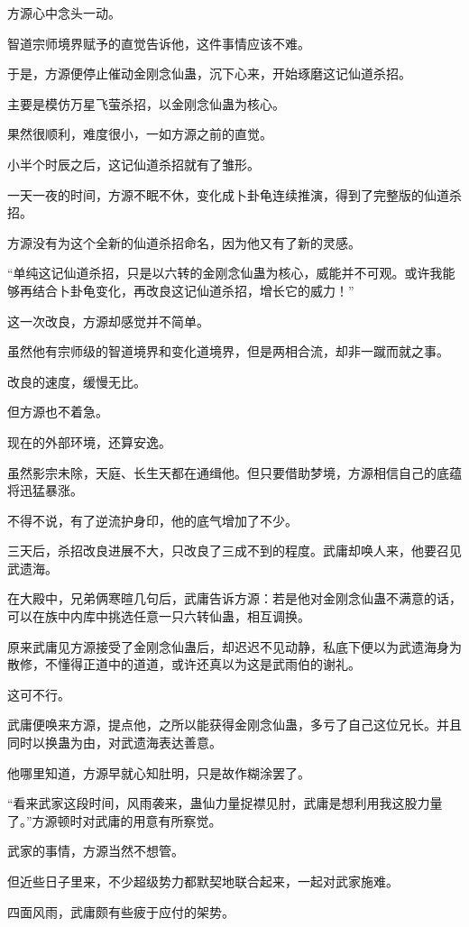 \begin{this_body}
方源心中念头一动。

智道宗师境界赋予的直觉告诉他，这件事情应该不难。

于是，方源便停止催动金刚念仙蛊，沉下心来，开始琢磨这记仙道杀招。

主要是模仿万星飞萤杀招，以金刚念仙蛊为核心。

果然很顺利，难度很小，一如方源之前的直觉。

小半个时辰之后，这记仙道杀招就有了雏形。

一天一夜的时间，方源不眠不休，变化成卜卦龟连续推演，得到了完整版的仙道杀招。

方源没有为这个全新的仙道杀招命名，因为他又有了新的灵感。

“单纯这记仙道杀招，只是以六转的金刚念仙蛊为核心，威能并不可观。或许我能够再结合卜卦龟变化，再改良这记仙道杀招，增长它的威力！”

这一次改良，方源却感觉并不简单。

虽然他有宗师级的智道境界和变化道境界，但是两相合流，却非一蹴而就之事。

改良的速度，缓慢无比。

但方源也不着急。

现在的外部环境，还算安逸。

虽然影宗未除，天庭、长生天都在通缉他。但只要借助梦境，方源相信自己的底蕴将迅猛暴涨。

不得不说，有了逆流护身印，他的底气增加了不少。

三天后，杀招改良进展不大，只改良了三成不到的程度。武庸却唤人来，他要召见武遗海。

在大殿中，兄弟俩寒暄几句后，武庸告诉方源：若是他对金刚念仙蛊不满意的话，可以在族中内库中挑选任意一只六转仙蛊，相互调换。

原来武庸见方源接受了金刚念仙蛊后，却迟迟不见动静，私底下便以为武遗海身为散修，不懂得正道中的道道，或许还真以为这是武雨伯的谢礼。

这可不行。

武庸便唤来方源，提点他，之所以能获得金刚念仙蛊，多亏了自己这位兄长。并且同时以换蛊为由，对武遗海表达善意。

他哪里知道，方源早就心知肚明，只是故作糊涂罢了。

“看来武家这段时间，风雨袭来，蛊仙力量捉襟见肘，武庸是想利用我这股力量了。”方源顿时对武庸的用意有所察觉。

武家的事情，方源当然不想管。

但近些日子里来，不少超级势力都默契地联合起来，一起对武家施难。

四面风雨，武庸颇有些疲于应付的架势。


\end{this_body}
